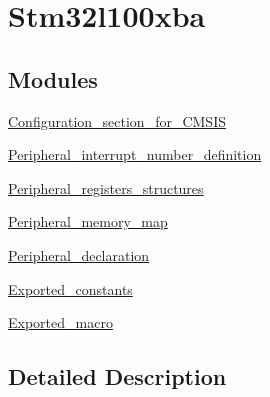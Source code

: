 \hypertarget{group__stm32l100xba}{\section{Stm32l100xba}
\label{group__stm32l100xba}
}
\subsection*{Modules}
\begin{DoxyCompactItemize}
\item 
\hyperlink{group___configuration__section__for___c_m_s_i_s}{Configuration\-\_\-section\-\_\-for\-\_\-\-C\-M\-S\-I\-S}
\item 
\hyperlink{group___peripheral__interrupt__number__definition}{Peripheral\-\_\-interrupt\-\_\-number\-\_\-definition}
\item 
\hyperlink{group___peripheral__registers__structures}{Peripheral\-\_\-registers\-\_\-structures}
\item 
\hyperlink{group___peripheral__memory__map}{Peripheral\-\_\-memory\-\_\-map}
\item 
\hyperlink{group___peripheral__declaration}{Peripheral\-\_\-declaration}
\item 
\hyperlink{group___exported__constants}{Exported\-\_\-constants}
\item 
\hyperlink{group___exported__macro}{Exported\-\_\-macro}
\end{DoxyCompactItemize}


\subsection{Detailed Description}
